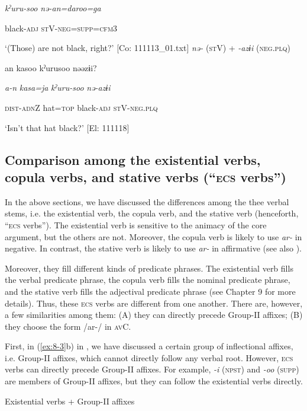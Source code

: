       \textit{kˀuru-soo}  \textit{nə-an=daroo=ga}

      black-\textsc{adj}  \textsc{st}V-\textsc{neg}=\textsc{supp}=\textsc{cfm}3

\glt ‘(Those) are not black, right?’ [Co: 111113\_01.txt]
\ex \textit{nə-} (\textsc{st}V) + \textit{{}-azɨi} (\textsc{neg}.\textsc{plq})

    {\TM}
\glll  an  kasoo  kˀurusoo  nəəzɨi?

      \textit{a-n}  \textit{kasa=ja}  \textit{kˀuru-soo}  \textit{nə-azɨi}

      \textsc{dist}-\textsc{adn}Z  hat=\textsc{top}  black-\textsc{adj}  \textsc{st}V-\textsc{neg}.\textsc{plq}

\glt ‘Isn’t that hat black?’ [El: 111118]

\subsection{Comparison among the existential verbs, copula verbs, and stative verbs (“\textsc{ecs} verbs”)}

In the above sections, we have discussed the differences among the thee verbal stems, i.e. the existential verb, the copula verb, and the stative verb (henceforth, “\textsc{ecs} verbs”). The existential verb is sensitive to the animacy of the core argument, but the others are not. Moreover, the copula verb is likely to use \textit{ar-} in negative. In contrast, the stative verb is likely to use \textit{ar-} in affirmative (see also ).

Moreover, they fill different kinds of predicate phrases. The existential verb fills the verbal predicate phrase, the copula verb fills the nominal predicate phrase, and the stative verb fills the adjectival predicate phrase (see Chapter 9 for more details). Thus, these \textsc{ecs} verbs are different from one another. There are, however, a few similarities among them: (A) they can directly precede Group-II affixes; (B) they choose the form /ar-/ in \textsc{av}C.

  First, in (\ref{ex:8-3}b) in , we have discussed a certain group of inflectional affixes, i.e. Group-II affixes, which cannot directly follow any verbal root. However, \textsc{ecs} verbs can directly precede Group-II affixes. For example, \textit{{}-i} (\textsc{npst}) and \textit{{}-oo} (\textsc{supp}) are members of Group-II affixes, but they can follow the existential verbs directly.

\textbf{\ea\label{ex:8-50}
}  Existential verbs + Group-II affixes

